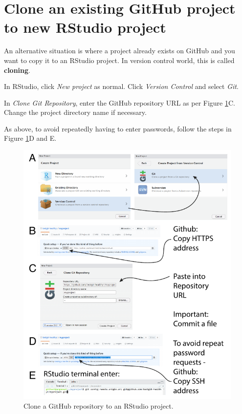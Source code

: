 \documentclass[
  12pt,
  krantz2]{krantz}
\begin{document}
\hypertarget{clone-an-existing-github-project-to-new-rstudio-project}{%
\section{Clone an existing GitHub project to new RStudio project}\label{clone-an-existing-github-project-to-new-rstudio-project}}


An alternative situation is where a project already exists on GitHub and you want to copy it to an RStudio project. In version control world, this is called \textbf{cloning}.

In RStudio, click \emph{New project} as normal. Click \emph{Version Control} and select \emph{Git}.

In \emph{Clone Git Repository}, enter the GitHub repository URL as per Figure \ref{fig:chap14-fig-clone}C.
Change the project directory name if necessary.

As above, to avoid repeatedly having to enter passwords, follow the steps in Figure \ref{fig:chap14-fig-clone}D and E.

\begin{figure}
\centering
\includegraphics{images/chapter14/7.pdf}
\caption{\label{fig:chap14-fig-clone}Clone a GitHub repository to an RStudio project.}
\end{figure}
\end{document}
